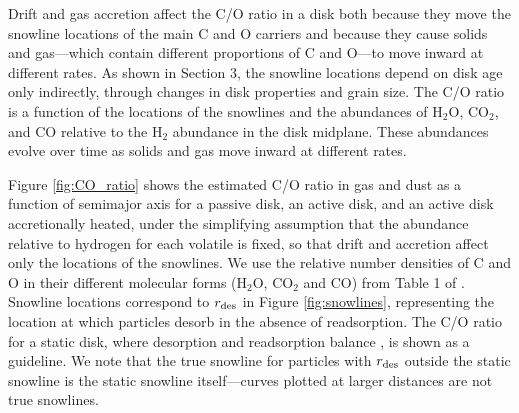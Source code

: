 \documentclass[apj]{emulateapj}
\begin{document}


Drift and gas accretion affect the C/O ratio in a disk both because they move the snowline locations of the main C and O carriers  and because they cause solids and gas---which contain different proportions of C and O---to move inward at different rates.  As shown in Section 3, the snowline locations depend on disk age only indirectly, through changes in disk properties and grain size.  The C/O ratio is a function of the locations of the snowlines and the abundances of H$_2$O, CO$_2$, and CO relative to the H$_2$ abundance in the disk midplane.   These abundances evolve over time as solids and gas move inward at different rates.

Figure \ref{fig:CO_ratio} shows the estimated C/O ratio in gas and dust as a function of semimajor axis for a passive disk, an active disk, and an active disk accretionally heated, under the simplifying assumption that the abundance relative to hydrogen for each volatile is fixed, so that drift and accretion affect only the locations of the snowlines. We use the relative number densities of C and O in their different molecular forms (H$_2$O, CO$_2$ and CO) from Table 1 of \citet{oberg11}.  Snowline locations correspond to $r_{\rm des}$ in Figure \ref{fig:snowlines}, representing the location at which particles desorb in the absence of readsorption.  The C/O ratio for a static disk, where desorption and readsorption balance \citep{hollenbach09}, is shown as a guideline. We note that the true snowline for particles with $r_{\rm des}$ outside the static snowline is the static snowline itself---curves plotted at larger distances are not true snowlines.
\end{document}
